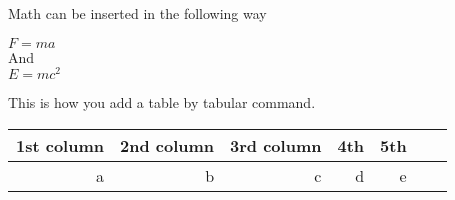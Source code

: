 \documentclass[12pt]{article}
\begin{document}
Math can be inserted in the following way \\
\begin{center}
    \label{force}
    $F = ma$\\
And \\ $ E = mc^2$ 
\end{center}

This is how you add a table by tabular command.\\
\break
\begin{tabular}{r|r|r|r|r|cl}
1st column & 2nd column & 3rd column & 4th & 5th\\
\hline a & \ b & c & d & e

\end{tabular}
\end{document}

